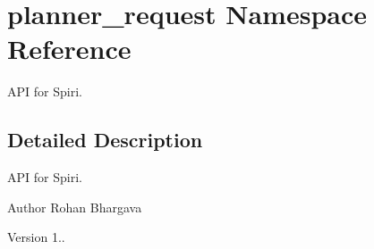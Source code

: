 \hypertarget{namespaceplanner__request}{\section{planner\-\_\-request \-Namespace \-Reference}
\label{namespaceplanner__request}
}


\-A\-P\-I for \-Spiri.  




\subsection{\-Detailed \-Description}
\-A\-P\-I for \-Spiri. \begin{DoxyAuthor}{\-Author}
\-Rohan \-Bhargava 
\end{DoxyAuthor}
\begin{DoxyVersion}{\-Version}
1.. 
\end{DoxyVersion}
